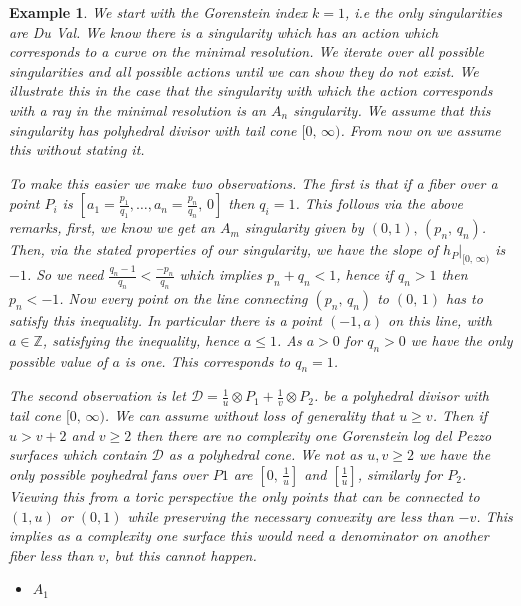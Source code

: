 \documentclass[12pt]{amsart}
\theoremstyle{plain}
\newtheorem{ex}[thm]{Example}
\newcommand{\mb}[1]{\mathbb{#1}}
\begin{document}
\begin{ex}\rm

We start with the Gorenstein index $k = 1$, i.e the only singularities are Du Val. We know there is a singularity which has an action which corresponds to a curve on the minimal resolution. We iterate over all possible singularities and all possible actions until we can show they do not exist. We illustrate this in the case that the singularity with which the action corresponds with a ray in the minimal resolution is an $A_n$ singularity. We assume that this singularity has polyhedral divisor with tail cone $[ 0, \, \infty)$. From now on we assume this without stating it.

To make this easier we make two observations. The first is that if a fiber over a point $P_i$ is $[a_1 = \frac{p_1}{q_1} , \dots, a_n = \frac{p_n}{q_n}, \, 0]$ then $q_i = 1$. This follows via the above remarks, first, we know we get an $A_m$ singularity given by $(0, 1), \, (p_n,  \, q_n)$. Then, via the stated properties of our singularity, we have the slope of $h_P|_{[0, \, \infty)}$ is $-1$. So we need $\frac{q_n-1}{q_n} < \frac{-p_n}{q_n}$ which implies $p_n + q_n < 1$, hence if $q_n > 1$ then $p_n < -1$. Now every point on the line connecting $(p_n, \, q_n)$ to $(0, \, 1)$ has to satisfy this inequality. In particular there is a point $(-1, a)$ on this line, with $a  \in \mb{Z}$, satisfying the inequality, hence $ a \leq 1$. As $ a>0$ for $q_n>0$ we have the only possible value of $a$ is one. This corresponds to $q_n = 1$.


The second observation is let $\mathcal{D} = \frac{1}{u} \otimes P_1 + \frac{1}{v} \otimes P_2$. be a polyhedral divisor with tail cone $[ 0 , \, \infty)$. We can assume without loss of generality that $u \geq v$. Then if $u>v+2$ and $v \geq 2$ then there are no complexity one Gorenstein log del Pezzo surfaces which contain $\mathcal{D}$ as a polyhedral cone. We not as $u,  v \geq 2$ we have the only possible poyhedral fans over $P1$ are $[0, \, \frac{1}{u}
]$ and $[\frac{1}{u}]$, similarly for $P_2$. Viewing this from a toric perspective the only points that can be connected to $(1,u)$ or $(0,1)$ while preserving the necessary convexity are less than $-v$. This implies as a complexity one surface this would need a denominator on another fiber less than $v$, but this cannot happen. 

\begin{itemize}

\item  $A_1$


\end{itemize}
\end{ex}
\end{document}
